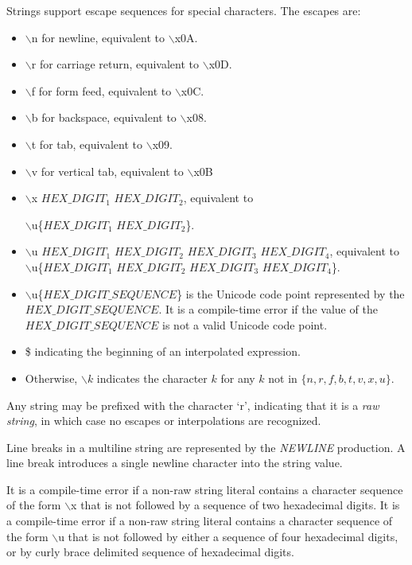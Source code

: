 \documentclass{article}
\begin{document}

\LMHash{}
Strings support escape sequences for special characters. The escapes are:
\begin{itemize}
\item $\backslash$n for newline, equivalent to $\backslash$x0A.
\item $\backslash$r for carriage return, equivalent to $\backslash$x0D.
\item $\backslash$f for form feed, equivalent to $\backslash$x0C.
\item $\backslash$b for backspace, equivalent to $\backslash$x08.
\item $\backslash$t for tab, equivalent to $\backslash$x09.
\item $\backslash$v for vertical tab, equivalent to $\backslash$x0B
\item $\backslash$x $HEX\_DIGIT_1$ $HEX\_DIGIT_2$, equivalent to

$\backslash$u\{$HEX\_DIGIT_1$ $HEX\_DIGIT_2$\}.
\item $\backslash$u $HEX\_DIGIT_1$ $HEX\_DIGIT_2$ $HEX\_DIGIT_3$ $HEX\_DIGIT_4$, equivalent to $\backslash$u\{$HEX\_DIGIT_1$ $HEX\_DIGIT_2$ $HEX\_DIGIT_3$ $HEX\_DIGIT_4$\}.
\item $\backslash$u\{$HEX\_DIGIT\_SEQUENCE$\} is the Unicode code point represented by the $HEX\_DIGIT\_SEQUENCE$. It is a compile-time error if the value of the $HEX\_DIGIT\_SEQUENCE$ is not a valid Unicode code point.
\item \$ indicating the beginning of an interpolated expression.
\item Otherwise, $\backslash k$ indicates the character $k$ for any $k$ not in $\{n, r, f, b, t, v, x, u\}$.
 \end{itemize}

\LMHash{}
Any string may be prefixed with the character `r', indicating that it is a {\em raw string}, in which case no escapes or interpolations are recognized.

\LMHash{}
Line breaks in a multiline string are represented by the {\em NEWLINE} production.
A line break introduces a single newline character into the string value.

\LMHash{}
It is a compile-time error if a non-raw string literal contains a character sequence of the form $\backslash$x that is not followed by a sequence of two hexadecimal digits. It is a compile-time error if a non-raw string literal  contains a character sequence of the form $\backslash$u that is not followed by either a sequence of four hexadecimal digits, or by curly brace delimited sequence of hexadecimal digits.
\end{document}
